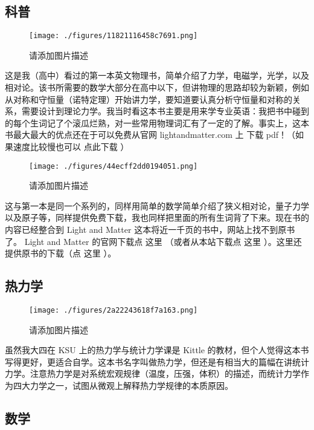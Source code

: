 
\begin{issues}
\issueDraft
\end{issues}

\subsection{科普}
\begin{figure}[ht]
\centering
\texttt{[image: ./figures/11821116458c7691.png]}
\caption{请添加图片描述} \label{fig_PhText_4}
\end{figure}
这是我（高中）看过的第一本英文物理书，简单介绍了力学，电磁学，光学，以及相对论。该书所需要的数学大部分在高中以下，但讲物理的思路却较为新颖，例如从对称和守恒量（诺特定理）开始讲力学，要知道要认真分析守恒量和对称的关系，需要设计到理论力学。我当时看这本书主要是用来学专业英语：我把书中碰到的每个生词记了个滚瓜烂熟，对一些常用物理词汇有了一定的了解。事实上，这本书最大最大的优点还在于可以免费从官网 lightandmatter.com 上 下载 pdf！（如果速度比较慢也可以 点此下载 ）

\begin{figure}[ht]
\centering
\texttt{[image: ./figures/44ecff2dd0194051.png]}
\caption{请添加图片描述} \label{fig_PhText_9}
\end{figure}
这与第一本是同一个系列的，同样用简单的数学简单介绍了狭义相对论，量子力学以及原子等，同样提供免费下载，我也同样把里面的所有生词背了下来。现在书的内容已经整合到 Light and Matter 这本将近一千页的书中，网站上找不到原书了。 Light and Matter 的官网下载点 这里 （或者从本站下载点 这里 ）。这里还提供原书的下载（点 这里 ）。

\subsection{热力学}
\begin{figure}[ht]
\centering
\texttt{[image: ./figures/2a22243618f7a163.png]}
\caption{请添加图片描述} \label{fig_PhText_1}
\end{figure}
虽然我大四在 KSU 上的热力学与统计力学课是 Kittle 的教材，但个人觉得这本书写得更好，更适合自学。这本书名字叫做热力学，但还是有相当大的篇幅在讲统计力学。注意热力学是对系统宏观规律（温度，压强，体积）的描述，而统计力学作为四大力学之一，试图从微观上解释热力学规律的本质原因。

\subsection{数学}

